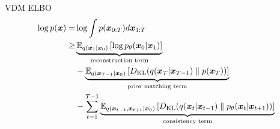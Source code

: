 \begin{frame}{VDM ELBO}
    \vspace{-1.4em}
    \begin{align*}
        \log p(\boldsymbol{x}) = & \log\int p(\boldsymbol{x}_{0:T})d \boldsymbol{x}_{1:T}                                                                                                                                                                \\
        \ge           & \underbrace{\mathbb{E}_{q(\boldsymbol{x}_{1}|\boldsymbol{x}_{0})}\left[\log p_{\theta}(\boldsymbol{x}_{0}|\boldsymbol{x}_{1})\right]}_{\textrm{reconstruction term}}                                                                        \\
                      & - \underbrace{\mathbb{E}_{q(\boldsymbol{x}_{T-1}|\boldsymbol{x}_{0})}\left[D_{\mathrm{KL}}(q(\boldsymbol{x}_{T}|\boldsymbol{x}_{T-1}) \parallel p(\boldsymbol{x}_{T}))\right]}_{\textrm{prior matching term}}                                          \\
                      & -\sum_{t=1}^{T-1}\underbrace{\mathbb{E}_{q(\boldsymbol{x}_{t-1},\boldsymbol{x}_{t+1}|\boldsymbol{x}_{0})}\left[D_{\mathrm{KL}}(q(\boldsymbol{x}_{t}|\boldsymbol{x}_{t-1}) \parallel p_{\theta}(\boldsymbol{x}_{t}|\boldsymbol{x}_{t+1}))\right]}_{\textrm{consistency term}} \\
    \end{align*}
\end{frame}